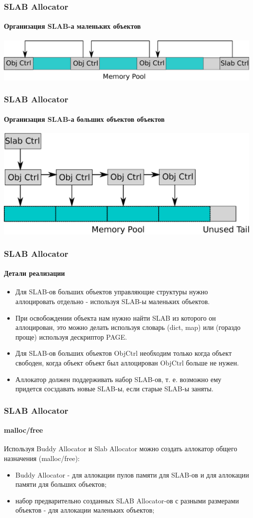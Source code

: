 \begin{frame}
\frametitle{SLAB Allocator}
\framesubtitle{Организация SLAB-а маленьких объектов}

\includegraphics[width=.9\linewidth]{slab-small}

\end{frame}

\begin{frame}
\frametitle{SLAB Allocator}
\framesubtitle{Организация SLAB-а больших объектов объектов}

\includegraphics[width=.9\linewidth]{slab-large}

\end{frame}

\begin{frame}
\frametitle{SLAB Allocator}
\framesubtitle{Детали реализации}

\begin{itemize}
  \item Для SLAB-ов больших объектов управляющие структуры нужно аллоцировать отдельно - используя SLAB-ы маленьких объектов.
  \item При освобождении объекта нам нужно найти SLAB из которого он аллоцирован, это можно делать используя словарь (dict, map) или (гораздо проще) используя дескриптор PAGE.
  \item Для SLAB-ов больших объектов ObjCtrl необходим только когда объект свободен, когда объект объект был аллоцирован ObjCtrl больше не нужен.
  \item Аллокатор должен поддерживать набор SLAB-ов, т. е. возможно ему придется сосздавать новые SLAB-ы, если старые SLAB-ы заняты.
\end{itemize}
\end{frame}

\begin{frame}
\frametitle{SLAB Allocator}
\framesubtitle{malloc/free}

Используя Buddy Allocator и Slab Allocator можно создать аллокатор общего назначения (malloc/free):
\begin{itemize}
  \item Buddy Allocator - для аллокации пулов памяти для SLAB-ов и для аллокации памяти для больших объектов;
  \item набор предварительно созданных SLAB Allocator-ов с разными размерами объектов - для аллокации маленьких объектов;
\end{itemize}
\end{frame}

